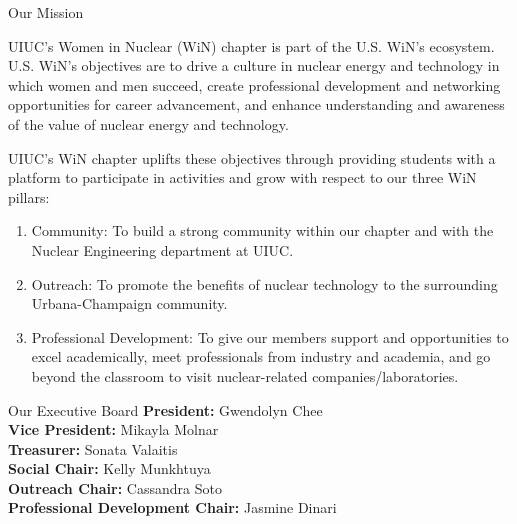 \documentclass{resume2} %
\begin{document}
\begin{rSection}{Our Mission}
\raggedright
UIUC's Women in Nuclear (WiN) chapter is part of the 
U.S. WiN's ecosystem. U.S. WiN's objectives are to 
drive a culture in nuclear energy and technology 
in which women and men succeed, create professional development 
and networking opportunities for career advancement, and enhance understanding 
and awareness of the value of nuclear energy and technology.

UIUC's WiN chapter uplifts these objectives through 
providing students with a platform to participate 
in activities and grow with respect to our three WiN 
pillars: 

\begin{enumerate}
	\item Community: To build a strong community within our chapter and 
	with the Nuclear Engineering department at UIUC. 
	\item Outreach: To promote the benefits of nuclear technology to the surrounding 
	Urbana-Champaign community. 
	\item Professional Development: To give our members support and opportunities to excel 
	academically, meet professionals from industry and academia, and go beyond the classroom 
	to visit nuclear-related companies/laboratories. 
\end{enumerate}

\end{rSection}

\begin{rSection}{Our Executive Board}
	\textbf{President:} Gwendolyn Chee  \\
	\textbf{Vice President:} Mikayla Molnar \\
	\textbf{Treasurer:} Sonata Valaitis \\
	\textbf{Social Chair:} Kelly Munkhtuya \\
	\textbf{Outreach Chair:} Cassandra Soto \\
	\textbf{Professional Development Chair:} Jasmine Dinari
\end{rSection}
\end{document}
